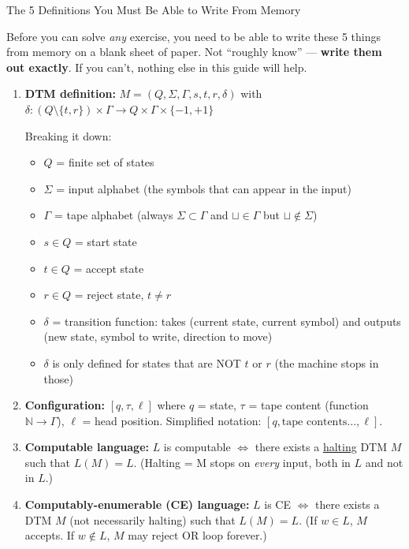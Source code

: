 \documentclass[11pt,a4paper]{article}
\newcommand{\blank}{\sqcup}
\begin{document}
\begin{conceptbox}{The 5 Definitions You Must Be Able to Write From Memory}

Before you can solve \emph{any} exercise, you need to be able to write these 5 things from memory on a blank sheet of paper. Not ``roughly know'' --- \textbf{write them out exactly}. If you can't, nothing else in this guide will help.

\begin{enumerate}
    \item \textbf{DTM definition:} $M = (Q, \Sigma, \Gamma, s, t, r, \delta)$ with $\delta : (Q \setminus \{t,r\}) \times \Gamma \to Q \times \Gamma \times \{-1, +1\}$

    Breaking it down:
    \begin{itemize}
        \item $Q$ = finite set of states
        \item $\Sigma$ = input alphabet (the symbols that can appear in the input)
        \item $\Gamma$ = tape alphabet (always $\Sigma \subset \Gamma$ and $\blank \in \Gamma$ but $\blank \notin \Sigma$)
        \item $s \in Q$ = start state
        \item $t \in Q$ = accept state
        \item $r \in Q$ = reject state, $t \neq r$
        \item $\delta$ = transition function: takes (current state, current symbol) and outputs (new state, symbol to write, direction to move)
        \item $\delta$ is only defined for states that are NOT $t$ or $r$ (the machine stops in those)
    \end{itemize}

    \item \textbf{Configuration:} $[q, \tau, \ell]$ where $q$ = state, $\tau$ = tape content (function $\mathbb{N} \to \Gamma$), $\ell$ = head position. Simplified notation: $[q, \text{tape contents}\ldots, \ell]$.

    \item \textbf{Computable language:} $L$ is computable $\iff$ there exists a \underline{halting} DTM $M$ such that $L(M) = L$. (Halting = M stops on \emph{every} input, both in $L$ and not in $L$.)

    \item \textbf{Computably-enumerable (CE) language:} $L$ is CE $\iff$ there exists a DTM $M$ (not necessarily halting) such that $L(M) = L$. (If $w \in L$, $M$ accepts. If $w \notin L$, $M$ may reject OR loop forever.)


\end{enumerate}
\end{conceptbox}
\end{document}
